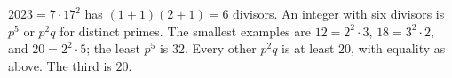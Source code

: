 $2023=7\cdot17^2$ has $(1+1)(2+1)=6$ divisors. An integer with six divisors is $p^5$ or $p^2q$ for distinct primes. The smallest examples are $12=2^2\cdot3$, $18=3^2\cdot2$, and $20=2^2\cdot5$; the least $p^5$ is $32$. Every other $p^2q$ is at least $20$, with equality as above. The third is $\boxed{20}$.
